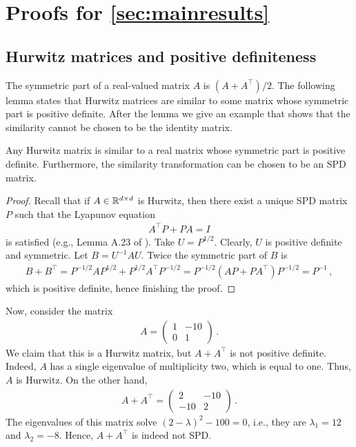 \appendix

\section{Proofs for \cref{sec:mainresults}}
\subsection{Hurwitz matrices and positive definiteness}
\label{sec:hurpd}
The symmetric part of a real-valued matrix $A$ is $(A+A^\top)/2$.
The following lemma states that Hurwitz matrices are similar to some matrix whose symmetric part is positive definite.
After the lemma we give an example that shows that the similarity cannot be chosen to be the identity matrix.
\begin{lemma}\label{lm:simtran}
Any Hurwitz matrix is similar to a real matrix whose symmetric part is positive definite.
Furthermore, the similarity transformation can be chosen to be an SPD matrix. 
\end{lemma}
\begin{proof}
Recall that if $A\in \mathbb{R}^{d\times d}$ is Hurwitz, then there exist a unique SPD matrix $P$ such that the Lyapunov equation
\begin{align*}
A^\top P + P A = I
\end{align*}
is satisfied (e.g., Lemma A.23 of \citet{french2003}).
Take $U = P^{1/2}$. Clearly, $U$ is positive definite and symmetric.
Let $B = U^{-1} A U$. 
Twice the symmetric part of $B$ is 
\begin{align*}
B+B^\top 
 = P^{-1/2} A P^{1/2} + P^{1/2} A^\top P^{-1/2} 
 = P^{-1/2} ( A P +  P A^\top ) P^{-1/2} = P^{-1}\,,
\end{align*}
which is positive definite, hence finishing the proof.
\end{proof}
Now, consider the matrix 
\begin{align*}
A = 
\begin{pmatrix}
1 & -10 \\
0 & 1
\end{pmatrix}\,.
\end{align*}
We claim that this is a Hurwitz matrix, but $A+A^\top$ is not positive definite.
Indeed, $A$ has a single eigenvalue of multiplicity two, which is equal to one. Thus, $A$ is Hurwitz.
On the other hand,
\begin{align*}
A + A^\top = 
\begin{pmatrix}
2 & -10 \\
-10 & 2
\end{pmatrix}\,.
\end{align*}
The eigenvalues of this matrix solve $(2-\lambda)^2 - 100=0$, i.e., they are
$\lambda_1 = 12$ and $\lambda_2 = -8$. Hence, $A+A^\top$ is indeed not SPD.

